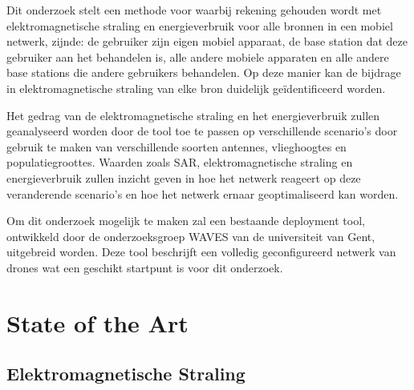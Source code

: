 \documentclass[twocolumn]{phdsymp_dutch}
\begin{document}
Dit onderzoek stelt een methode voor waarbij rekening gehouden wordt met 
elektromagnetische straling en energieverbruik voor alle bronnen in een mobiel netwerk, zijnde: de gebruiker zijn eigen 
mobiel apparaat, de base station dat deze gebruiker aan het behandelen is, alle andere mobiele apparaten en 
alle andere base stations die andere gebruikers behandelen. Op deze manier kan de bijdrage in elektromagnetische straling
 van elke bron duidelijk geïdentificeerd worden. 

Het gedrag van de elektromagnetische straling en het energieverbruik zullen geanalyseerd worden door de 
tool toe te passen op verschillende scenario's door gebruik te maken van verschillende soorten antennes, vlieghoogtes 
en populatiegroottes.
Waarden zoals \gls{SAR}, elektromagnetische straling en energieverbruik zullen inzicht 
geven in hoe het netwerk reageert op deze veranderende scenario's en hoe het netwerk 
ernaar geoptimaliseerd kan worden.

Om dit onderzoek mogelijk te maken zal een bestaande deployment tool, ontwikkeld
door de onderzoeksgroep WAVES van de universiteit van Gent, uitgebreid worden. Deze tool 
beschrijft een volledig geconfigureerd netwerk van drones wat een geschikt startpunt is voor dit onderzoek.

\section{State of the Art}
\subsection{Elektromagnetische Straling}
\end{document}
